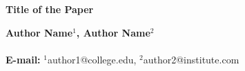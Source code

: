 \documentclass[12pt,twoside]{article}
\begin{document}
 \begin{singlespace}
 \begin{center}
\fontsize{24}{24}\selectfont\textbf
{Title of the Paper}
\end{center}
\vspace{24pt}
\fontsize{16}{16}\selectfont\textbf{
Author Name$^1$, Author Name$^2$}
\vspace{16pt}\\
\fontsize{11}{11}\selectfont {
$^1$Department, College, University, City, Country \\
$^2$Department, College, University, City, Country
}\vspace{16pt}\\
{\fontsize{9}{9}\selectfont\textbf{{E-mail:}} $^1$author1@college.edu, $^2$author2@institute.com}\\

\end{singlespace}
\fontsize{12}{12}\selectfont
\end{document}

